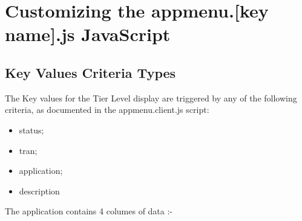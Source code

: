 \documentclass[letterpaper,10pt,english]{sphinxmanual}
\begin{document}
\begin{sphinxVerbatim}[commandchars=\\\{\}]
\PYG{p}{[} \PYG{p}{]}             
\PYG{p}{[} \PYG{p}{]}           
\PYG{p}{[} \PYG{p}{]}               
                
\end{sphinxVerbatim}


\section{Customizing the appmenu.{[}key name{]}.js JavaScript}
\label{\detokenize{Customization:customizing-the-appmenu-key-name-js-javascript}}

\subsection{Key Values Criteria Types}
\label{\detokenize{Customization:key-values-criteria-types}}
The Key values for the Tier Level display are triggered by any of the following criteria, as documented in the appmenu.client.js script:
\begin{itemize}
\item {} 
status;

\item {} 
tran;

\item {} 
application;

\item {} 
description

\end{itemize}

The application contains 4 columes of data :-

\begin{sphinxVerbatim}[commandchars=\\\{\}]
   
   
   
   
\end{sphinxVerbatim}
\end{document}
